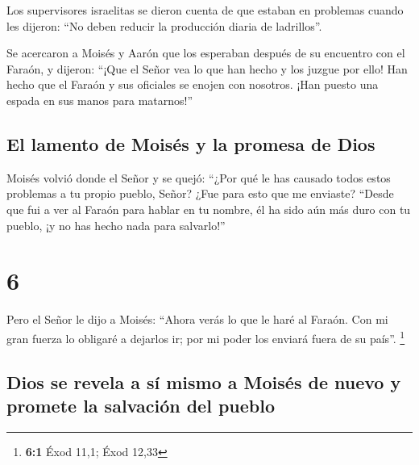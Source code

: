  Los supervisores israelitas se dieron cuenta de que
estaban en problemas cuando les dijeron: ``No deben reducir la
producción diaria de ladrillos''.

 Se acercaron a Moisés y Aarón que los esperaban después
de su encuentro con el Faraón,  y dijeron: ``¡Que el
Señor vea lo que han hecho y los juzgue por ello! Han hecho que el
Faraón y sus oficiales se enojen con nosotros. ¡Han puesto una espada en
sus manos para matarnos!''

\hypertarget{el-lamento-de-moisuxe9s-y-la-promesa-de-dios}{%
\subsection{El lamento de Moisés y la promesa de
Dios}\label{el-lamento-de-moisuxe9s-y-la-promesa-de-dios}}

 Moisés volvió donde el Señor y se quejó: ``¿Por qué le
has causado todos estos problemas a tu propio pueblo, Señor? ¿Fue para
esto que me enviaste?  ``Desde que fui a ver al Faraón
para hablar en tu nombre, él ha sido aún más duro con tu pueblo, ¡y no
has hecho nada para salvarlo!''

\hypertarget{section-5}{%
\section{6}\label{section-5}}

 Pero el Señor le dijo a Moisés: ``Ahora verás lo que le
haré al Faraón. Con mi gran fuerza lo obligaré a dejarlos ir; por mi
poder los enviará fuera de su país''. \footnote{\textbf{6:1} Éxod 11,1;
  Éxod 12,33}

\hypertarget{dios-se-revela-a-suxed-mismo-a-moisuxe9s-de-nuevo-y-promete-la-salvaciuxf3n-del-pueblo}{%
\subsection{Dios se revela a sí mismo a Moisés de nuevo y promete la
salvación del
pueblo}\label{dios-se-revela-a-suxed-mismo-a-moisuxe9s-de-nuevo-y-promete-la-salvaciuxf3n-del-pueblo}}

